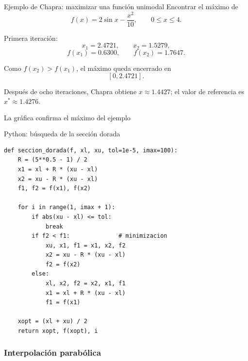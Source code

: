\documentclass[../../main.tex]{subfiles}
\begin{document}
\begin{frame}{Ejemplo de Chapra: maximizar una función unimodal}
Encontrar el máximo de
\[
f(x)=2\sin x-\frac{x^2}{10},
\qquad 0\le x\le4.
\]

Primera iteración:
\[
x_1=2.4721,
\qquad
x_2=1.5279,
\]
\[
f(x_1)=0.6300,
\qquad
f(x_2)=1.7647.
\]

Como $f(x_2)>f(x_1)$, el máximo queda encerrado en
\[
[0,2.4721].
\]

Después de ocho iteraciones, Chapra obtiene $x\approx1.4427$; el valor de referencia es $x^*\approx1.4276$.
\end{frame}

\begin{frame}{La gráfica confirma el máximo del ejemplo}
\centering
{}
\end{frame}

\begin{frame}[fragile]{Python: búsqueda de la sección dorada}
\scriptsize
\begin{lstlisting}[style=mypython]
def seccion_dorada(f, xl, xu, tol=1e-5, imax=100):
    R = (5**0.5 - 1) / 2
    x1 = xl + R * (xu - xl)
    x2 = xu - R * (xu - xl)
    f1, f2 = f(x1), f(x2)

    for i in range(1, imax + 1):
        if abs(xu - xl) <= tol:
            break
        if f2 < f1:              # minimizacion
            xu, x1, f1 = x1, x2, f2
            x2 = xu - R * (xu - xl)
            f2 = f(x2)
        else:
            xl, x2, f2 = x2, x1, f1
            x1 = xl + R * (xu - xl)
            f1 = f(x1)

    xopt = (xl + xu) / 2
    return xopt, f(xopt), i
\end{lstlisting}
\end{frame}

\subsubsection{Interpolación parabólica}
\end{document}
